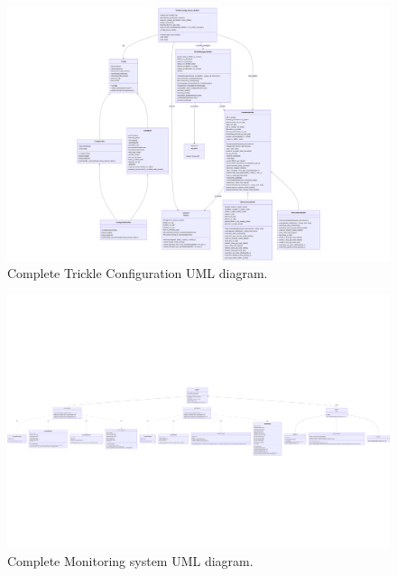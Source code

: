 \chapter{}
\label{ch:appendix}

\begin{figure}[H]
    \centering
    \includegraphics[width=\textwidth,height=\textheight,keepaspectratio]{images/appendix/complete-trickle-config-uml.png}
    \caption{Complete Trickle Configuration UML diagram.}
    \label{fig:complete-trickle-uml}
\end{figure}

\clearpage

\begin{figure}
    \centering
    \includegraphics[width=\textwidth,height=\textheight,keepaspectratio]{images/appendix/complete-monitoring-uml.png}
    \caption{Complete Monitoring system UML diagram.}
    \label{fig:complete-monitoring-uml}
\end{figure}